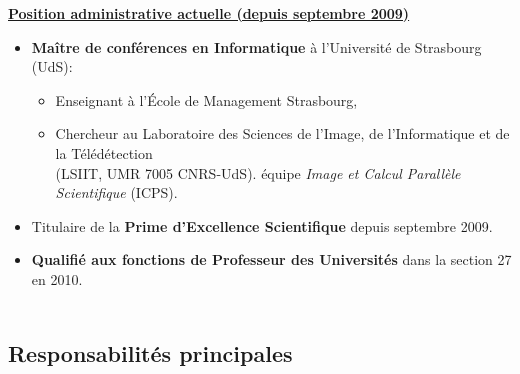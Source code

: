 \documentclass[11pt]{article}
\begin{document}
\vspace{7mm}
\textbf{\underline{Position administrative actuelle (depuis septembre 2009)}}
\vspace{5mm}

\begin{itemize}
\item
 	\textbf{Maître de conférences en Informatique} à l'Université de Strasbourg (UdS):
	\begin{itemize}
		\item Enseignant à l'\'Ecole de Management Strasbourg,
		\item Chercheur au Laboratoire des Sciences de l'Image, de l'Informatique et de la Télédétection \\
			(LSIIT, UMR 7005 CNRS-UdS).
équipe \textit{Image et Calcul Parallèle Scientifique} (ICPS).
\\[1mm]
	\end{itemize}

\item Titulaire de la \textbf{Prime d'Excellence Scientifique} depuis septembre 2009.\\

\item \textbf{Qualifié aux fonctions de Professeur des Universités} dans la section 27 en 2010.\\
	\\[2mm]
\end{itemize}


\subsection{Responsabilités principales}
\end{document}
